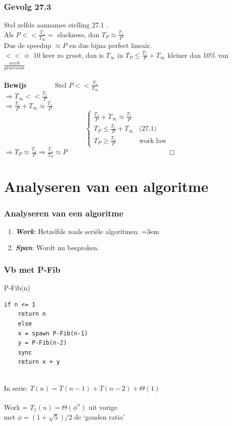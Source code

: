 \documentclass
   [kulak] %
   {kulakbeamer}
\begin{document}
\begin{frame}
	\frametitle{Gevolg 27.3}
	Stel zelfde aannames stelling 27.1 .
	\\ Als $P << \frac{T_1}{T_\infty} =$ slackness, dan $T_P \approx \frac{T_1}{P} $ \\
	Dus de speedup $\approx P$ en dus bijna perfect lineair.\\ $<< \approx$ 10 keer zo groot, dan is $T_\infty$ in $T_P \leqslant \frac{T_1}{P} + T_\infty$ kleiner dan 10\% van $\frac{werk}{processor}$  \pause \\~\\
	\textbf{Bewijs} ~~~~~~~
	Stel $P << \frac{T_1}{T_\infty}$ \\
	$\Rightarrow T_\infty << \frac{T_1}{P} $ \\
	$\Rightarrow \frac{T_1}{P} + T_\infty \approx \frac{T_1}{P} $ \\
	\[
		\begin{cases}
			\frac{T_1}{P} + T_\infty \approx \frac{T_1}{P} & \\
			T_P \leqslant \frac{T_1}{P} + T_\infty & \text{(27.1)}  \\
			T_P \geqslant \frac{T_1}{P} & \text{work law}
		\end{cases}
	\]
	$\Rightarrow T_P \approx \frac{T_1}{P} \Rightarrow \frac{T_1}{T_P}\approx P$ ~~~~~~~~~~~~~~~~~~~~~~~~~~~~ $\Box$
	
\end{frame}

\section[Analyse]{Analyseren van een algoritme}

\begin{frame}
	\frametitle{Analyseren van een algoritme}
	\begin{enumerate}
		\item \textbf{\textit{Work}}: Hetzelfde zoals seriële algoritmen.
		\pause
		\itemsep=3em
		\item \textbf{\textit{Span}}: Wordt nu besproken.
	\end{enumerate}
\end{frame}

\begin{frame}[fragile]
	\frametitle{Vb met P-Fib}
	P-Fib(n)
	\begin{lstlisting}[style=CStyle]
	if n <= 1
	return n
	else 
	x = spawn P-Fib(n-1)
	y = P-Fib(n-2)
	sync
	return x + y
	\end{lstlisting}
	
	~\\In serie: $T(n) = T(n-1) + T(n-2) + \Theta(1)$ \\~\\
	Work = $T_1 (n) = \Theta(\phi^n)$ uit vorige\\ met
	$\phi = (1 + \sqrt{5})/2$ de `gouden ratio'
	
\end{frame}
\end{document}
